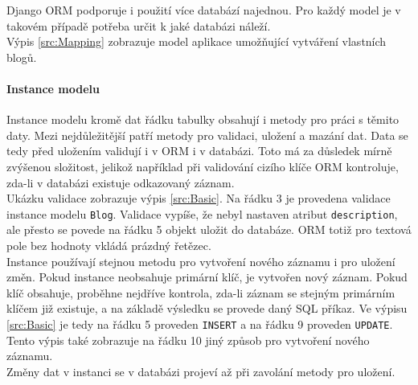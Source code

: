 \documentclass[ing,male,java,dept456]{diploma}						%
\begin{document}
Django ORM podporuje i použití více databází najednou. Pro každý model je v takovém případě potřeba určit k jaké databázi náleží. \\
Výpis \ref{src:Mapping} zobrazuje model aplikace umožňující vytváření vlastních blogů. 

\paragraph{Instance modelu}

Instance modelu kromě dat řádku tabulky obsahují i metody pro práci s těmito daty. Mezi nejdůležitější patří metody pro validaci, uložení a mazání dat. Data se tedy před uložením validují i v ORM i v databázi. Toto má za důsledek mírně zvýšenou složitost, jelikož například při validování cizího klíče ORM kontroluje, zda-li v databázi existuje odkazovaný záznam. \\
Ukázku validace zobrazuje výpis \ref{src:Basic}. Na řádku 3 je provedena validace instance modelu \lstinline[style=inlinepython]|Blog|. Validace vypíše, že nebyl nastaven atribut \lstinline[style=inlinepython]|description|, ale přesto se povede na řádku 5 objekt uložit do databáze. ORM totiž pro textová pole bez hodnoty vkládá prázdný řetězec. \\
Instance používají stejnou metodu pro vytvoření nového záznamu i pro uložení změn. Pokud instance neobsahuje primární klíč, je vytvořen nový záznam. Pokud klíč obsahuje, proběhne nejdříve kontrola, zda-li záznam se stejným primárním klíčem již existuje, a na základě výsledku se provede daný SQL příkaz. Ve výpisu \ref{src:Basic} je tedy na řádku 5 proveden \lstinline[style=inlinepython]|INSERT| a na řádku 9 proveden \lstinline[style=inlinepython]|UPDATE|. Tento výpis také zobrazuje na řádku 10 jiný způsob pro vytvoření nového záznamu.\\
Změny dat v instanci se v databázi projeví až při zavolání metody pro uložení. 
\end{document}
